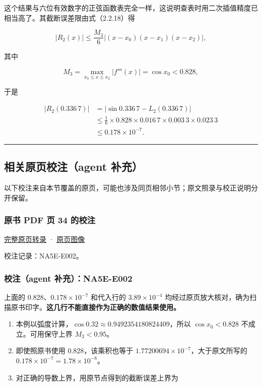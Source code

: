 \documentclass[
  10pt,
  fontset=fandol]{ctexart}
\providecommand{\tightlist}{%
  \setlength{\itemsep}{0pt}\setlength{\parskip}{0pt}}
\begin{document}
这个结果与六位有效数字的正弦函数表完全一样，这说明查表时用二次插值精度已相当高了。其截断误差限由式（2.2.18）得

\[
|R_2(x)|\le\frac{M_3}{6}|(x-x_0)(x-x_1)(x-x_2)|,
\]

其中

\[
M_3=\max_{x_0\le x\le x_2}|f'''(x)|=\cos x_0<0.828,
\]

于是

\[
\begin{aligned}
|R_2(0.336\,7)|
&=|\sin0.336\,7-L_2(0.336\,7)|\\
&\le\frac16\times0.828\times0.016\,7\times0.003\,3\times0.023\,3\\
&\le0.178\times10^{-7}.
\end{aligned}
\]

\begin{center}\rule{0.5\linewidth}{0.5pt}\end{center}

\subsection{相关原页校注（agent 补充）}\label{ux76f8ux5173ux539fux9875ux6821ux6ce8agent-ux8865ux5145}

以下校注来自本节覆盖的原页，可能也涉及同页相邻小节；原文照录与校正说明分开保留。

\subsubsection{原书 PDF 页 34 的校注}\label{ux539fux4e66-pdf-ux9875-34-ux7684ux6821ux6ce8}

\href{../pages/pdf-034.md}{完整原页转录} · \href{../../source-images/pdf-034.jpeg}{原页图像}

校注记录：NA5E-E002。

\subsubsection{校注（agent 补充）：NA5E-E002}\label{ux6821ux6ce8agent-ux8865ux5145na5e-e002}

上面的 \(0.828\)、\(0.178\times10^{-7}\) 和代入行的 \(3.89\times10^{-4}\) 均经过原页放大核对，确为扫描原书印字。\textbf{这几行不能直接作为正确的数值结果使用。}

\begin{enumerate}
\def\labelenumi{\arabic{enumi}.}
\tightlist
\item
  本例以弧度计算，\(\cos0.32\approx0.9492354180824409\)，所以 \(\cos x_0<0.828\) 不成立。可用保守上界 \(M_3<0.95\)。
\item
  即使照原书使用 \(0.828\)，该乘积也等于 \(1.77200694\times10^{-7}\)，大于原文所写的 \(0.178\times10^{-7}=1.78\times10^{-8}\)。
\item
  对正确的导数上界，用原节点得到的截断误差上界为
\end{enumerate}
\end{document}
